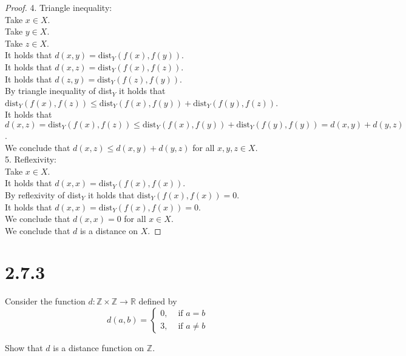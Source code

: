 \documentclass{article}
\theoremstyle{mytheoremstyle}
\theoremstyle{mytheoremstyle}
\theoremstyle{myproblemstyle}
\begin{document}
\begin{proof}
        4. Triangle inequality: \\
        Take $x \in X$. \\
        Take $y \in X$. \\
        Take $z \in X$. \\
        It holds that $d(x,y) = \text{dist}_Y(f(x),f(y))$. \\
        It holds that $d(x,z) = \text{dist}_Y(f(x),f(z))$. \\
        It holds that $d(z,y) = \text{dist}_Y(f(z),f(y))$. \\
        By triangle inequality of dist$_Y$ it holds that $\text{dist}_Y(f(x),f(z)) \leq \text{dist}_Y(f(x),f(y)) + \text{dist}_Y(f(y),f(z))$. \\
        It holds that $d(x,z) = \text{dist}_Y(f(x),f(z)) \leq \text{dist}_Y(f(x),f(y)) + \text{dist}_Y(f(y),f(y)) = d(x,y) + d(y,z)$. \\
        We conclude that $d(x,z) \leq d(x,y) + d(y,z)$ for all $x,y,z \in X$. \\

        5. Reflexivity: \\
        Take $x \in X$. \\
        It holds that $d(x,x) = \text{dist}_Y(f(x),f(x))$. \\
        By reflexivity of dist$_Y$ it holds that $\text{dist}_Y(f(x),f(x)) = 0$. \\
        It holds that $d(x,x) = \text{dist}_Y(f(x),f(x)) = 0$. \\
        We conclude that $d(x,x) = 0$ for all $x \in X$. \\

        We conclude that $d$ is a distance on $X$.
    \end{proof}

    \newpage

    \section{2.7.3}
    \begin{problem}
        Consider the function $d: \mathbb{Z} \times \mathbb{Z} \to \mathbb{R}$ defined by
        $$d(a,b) = 
        \begin{cases} 0, &\text{ if } a = b \\
                      3, &\text{ if } a \ne b
        \end{cases}$$

        Show that $d$ is a distance function on $\mathbb{Z}$.
    \end{problem}
\end{document}
